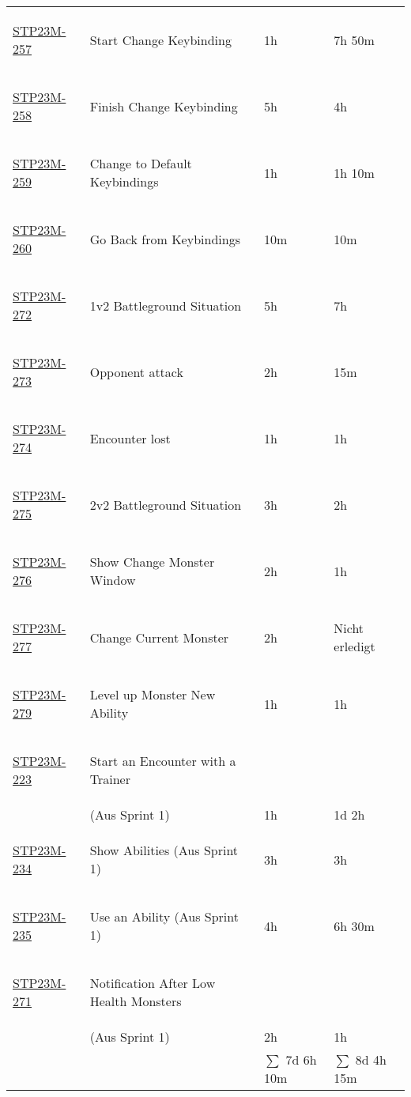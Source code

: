 \begin{longtable}{|l|l|l|l|}
    \hypertarget{T257}{\hyperlink{S257}{STP23M-257}} & Start Change Keybinding & 1h & 7h 50m\\
    \hypertarget{T258}{\hyperlink{S258}{STP23M-258}} & Finish Change Keybinding & 5h & 4h\\
    \hypertarget{T259}{\hyperlink{S259}{STP23M-259}} & Change to Default Keybindings & 1h & 1h 10m\\
    \hypertarget{T260}{\hyperlink{S260}{STP23M-260}} & Go Back from Keybindings & 10m & 10m\\
    \hypertarget{T272}{\hyperlink{S272}{STP23M-272}} & 1v2 Battleground Situation & 5h & 7h\\
    \hypertarget{T273}{\hyperlink{S273}{STP23M-273}} & Opponent attack & 2h & 15m\\
    \hypertarget{T274}{\hyperlink{S274}{STP23M-274}} & Encounter lost & 1h & 1h\\
    \hypertarget{T275}{\hyperlink{S275}{STP23M-275}} & 2v2 Battleground Situation & 3h & 2h\\
    \hypertarget{T276}{\hyperlink{S276}{STP23M-276}} & Show Change Monster Window & 2h & 1h\\
    \hypertarget{T277}{\hyperlink{S277}{STP23M-277}} & Change Current Monster & 2h & Nicht erledigt\\
    \hypertarget{T279}{\hyperlink{S279}{STP23M-279}} & Level up Monster New Ability & 1h & 1h\\
    \hypertarget{T223}{\hyperlink{S223}{STP23M-223}} & Start an Encounter with a Trainer & & \\
    & (Aus Sprint 1) & 1h & 1d 2h\\
    \hypertarget{T234}{\hyperlink{S234}{STP23M-234}} & Show Abilities (Aus Sprint 1) & 3h & 3h\\
    \hypertarget{T235}{\hyperlink{S235}{STP23M-235}} & Use an Ability (Aus Sprint 1) & 4h & 6h 30m\\
    \hypertarget{T271}{\hyperlink{S271}{STP23M-271}} & Notification After Low Health Monsters & & \\
    & (Aus Sprint 1) & 2h & 1h\\
    \hline
    & & $\sum$ 7d 6h 10m & $\sum$ 8d 4h 15m\\
\end{longtable}

